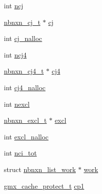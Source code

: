 \begin{DoxyCompactItemize}
\item 
int \hyperlink{structnbnxn__pairlist__t_ad69eb635c4ef38972e01dc001198ddc4}{ncj}
\item 
\hyperlink{structnbnxn__cj__t}{nbnxn\-\_\-cj\-\_\-t} $\ast$ \hyperlink{structnbnxn__pairlist__t_a699cd8909b2180403d066b0172cc9dd2}{cj}
\item 
int \hyperlink{structnbnxn__pairlist__t_a6bce72970ae4ad9f5e51f82383fc9678}{cj\-\_\-nalloc}
\item 
int \hyperlink{structnbnxn__pairlist__t_a48d49b25a198a1be3a3657c61d7a3ccd}{ncj4}
\item 
\hyperlink{structnbnxn__cj4__t}{nbnxn\-\_\-cj4\-\_\-t} $\ast$ \hyperlink{structnbnxn__pairlist__t_a83e971e2e9d773812855cb5034eb723a}{cj4}
\item 
int \hyperlink{structnbnxn__pairlist__t_a2ba05d9ef0e44dafedf314237038075c}{cj4\-\_\-nalloc}
\item 
int \hyperlink{structnbnxn__pairlist__t_a10297175f82aaa84dfb53e9a2c2c58a3}{nexcl}
\item 
\hyperlink{structnbnxn__excl__t}{nbnxn\-\_\-excl\-\_\-t} $\ast$ \hyperlink{structnbnxn__pairlist__t_a0daa58154399e4663b9557a0dfb71a1c}{excl}
\item 
int \hyperlink{structnbnxn__pairlist__t_a23220ef74183aac37d0826ce8204a208}{excl\-\_\-nalloc}
\item 
int \hyperlink{structnbnxn__pairlist__t_aa74dadeb15eeb35b20b3f5a1aa73c62e}{nci\-\_\-tot}
\item 
struct \hyperlink{structnbnxn__list__work}{nbnxn\-\_\-list\-\_\-work} $\ast$ \hyperlink{structnbnxn__pairlist__t_a5edb3fd3a8ca19ec7718afd7acc24a6a}{work}
\item 
\hyperlink{structgmx__cache__protect__t}{gmx\-\_\-cache\-\_\-protect\-\_\-t} \hyperlink{structnbnxn__pairlist__t_af52d88b22274383e31cb16962736c251}{cp1}
\end{DoxyCompactItemize}


